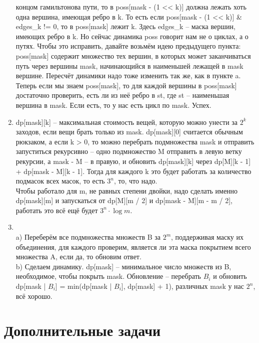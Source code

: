 \documentclass[12pt]{article}
\begin{document}
\begin{enumerate}
    концом гамильтонова пути, то в poss[mask - (1 << k)] должна лежать хоть одна вершина, 
    имеющая ребро в k. То есть если poss[mask - (1 << k)] \& edges\_k != 0, то в poss[mask] 
    лежит k. Здесь edges\_k -- маска вершин, имеющих ребро в k. Но сейчас динамика poss говорит 
    нам не о циклах, а о путях. Чтобы это исправить, давайте возьмём идею предыдущего пункта: 
    poss[mask] содержит множество тех вершин, в которых может заканчиваться путь через вершины 
    mask, начинающийся в наименьшей лежащей в mask вершине. Пересчёт динамики надо тоже 
    изменить так же, как в пункте a. \\
    Теперь если мы знаем poss[mask], то для каждой вершины в poss[mask] достаточно проверить, 
    есть ли из неё ребро в st, где st -- наименьшая вершина в mask. Если есть, то у нас есть 
    цикл по mask. Успех. \\
    \item dp[mask][k] -- максимальная стоимость вещей, которую можно унести за $2^k$ заходов, 
    если вещи брать только из mask. dp[mask][0] считается обычным рюкзаком, а если k > 0, 
    то можно перебрать подмножества mask и отправить запуститься рекурсивно -- одно подмножество 
    M отправить в левую ветку рекурсии, а mask - M -- в правую, и обновить dp[mask][k] через 
    dp[M][k - 1] + dp[mask - M][k - 1]. Тогда для каждого k это будет работать за количество 
    подмасок всех масок, то есть $3^n$, то, что надо. \\
    Чтобы работало для m, не равных степени двойки, надо сделать именно dp[mask][m] и запускаться
    от dp[M][m / 2] и dp[mask - M][m - m / 2], работать это всё ещё будет $3^n \cdot \log m$. \\
    \item ~\\
    a) Переберём все подмножества множеств B за $2^m$, поддерживая маску их объединения, 
    для каждого проверим, является ли эта маска покрытием всего множества A, если да, то 
    обновим ответ. \\
    b) Сделаем динамику. dp[mask] -- минимальное число множеств из B, необходимое, чтобы 
    покрыть mask. Обновление -- перебрать $B_i$ и обновить dp[mask | $B_i$] = min(dp[mask | 
    $B_i$], dp[mask] + 1), различных mask у нас $2^n$, всё хорошо. \\
\end{enumerate}

\section{Дополнительные задачи}
\end{document}
